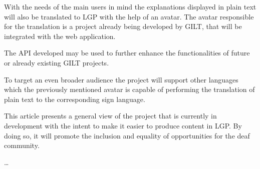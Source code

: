 \documentclass[runningheads]{llncs}
\begin{document}
With the needs of the main users in mind the explanations displayed in plain text will also be translated to LGP with the help of an avatar.
The avatar responsible for the translation is a project already being developed by GILT, that will be integrated with the web application.

The API developed may be used to further enhance the functionalities of future or already existing GILT projects.

To target an even broader audience the project will support other languages which the previously mentioned avatar is capable of performing the translation of plain text to the corresponding sign language.

This article presents a general view of the project that is currently in development with the intent to make it easier to produce content in LGP.
By doing so, it will promote the inclusion and equality of opportunities for the deaf community.

\dots
\end{document}
